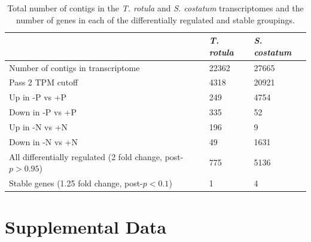 \begin{table}[h!]
\centering
\caption[Mapping statistics for \textit{T. rotula} and \textit{S. costatum} transcriptomes]{Total number of contigs in the \textit{T. rotula} and \textit{S. costatum} transcriptomes and the number of genes in each of the differentially regulated and stable groupings.}
\label{tab:a3t3}
\begin{tabular}{|l|l|l|}
\hline
                                                                       & \textit{\textbf{T. rotula}} & \textit{\textbf{S. costatum}} \\ \hline
Number of contigs in transcriptome                                     & 22362                       & 27665                         \\ \hline
Pass 2 TPM cutoff                                                      & 4318                        & 20921                         \\ \hline
Up in -P vs +P                                                         & 249                         & 4754                          \\ \hline
Down in -P vs +P                                                       & 335                         & 52                            \\ \hline
Up in -N vs +N                                                         & 196                         & 9                             \\ \hline
Down in -N vs +N                                                       & 49                          & 1631                          \\ \hline
All differentially regulated (2 fold change, post-$p > 0.95$) & 775                         & 5136                          \\ \hline
Stable genes (1.25 fold change, post-$p < 0.1$)                  & 1                           & 4                             \\ \hline
\end{tabular}
\end{table}

\clearpage

\section{Supplemental Data}

